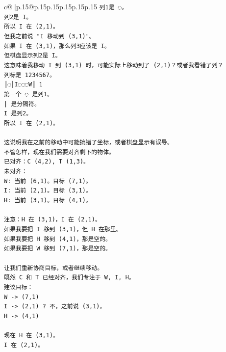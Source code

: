 \documentclass{article}
\begin{document}
{\begin{supertabular}{c@{$\;$}|p{.15\linewidth}@{}p{.15\linewidth}p{.15\linewidth}p{.15\linewidth}p{.15\linewidth}p{.15\linewidth}}
{{{\texttt{列1是 ◌。} \\
\texttt{列2是 I。} \\
\texttt{所以 I 在 (2,1)。} \\
\texttt{但我之前说 "I 移动到 (3,1)"。} \\
\texttt{如果 I 在 (3,1)，那么列3应该是 I。} \\
\texttt{但棋盘显示列2是 I。} \\
\texttt{这意味着我移动 I 到 (3,1) 时，可能实际上移动到了 (2,1)？或者我看错了列？} \\
\texttt{列标是 1234567。} \\
\texttt{║◌│I◌◌◌W║ 1} \\
\texttt{第一个 ◌ 是列1。} \\
\texttt{| 是分隔符。} \\
\texttt{I 是列2。} \\
\texttt{所以 I 在 (2,1)。} \\
\\ 
\texttt{这说明我在之前的移动中可能搞错了坐标，或者棋盘显示有误导。} \\
\texttt{不管怎样，现在我们需要对齐剩下的物体。} \\
\texttt{已对齐：C (4,2), T (1,3)。} \\
\texttt{未对齐：} \\
\texttt{W: 当前 (6,1)。目标 (7,1)。} \\
\texttt{I: 当前 (2,1)。目标 (3,1)。} \\
\texttt{H: 当前 (3,1)。目标 (4,1)。} \\
\\ 
\texttt{注意：H 在 (3,1)，I 在 (2,1)。} \\
\texttt{如果我要把 I 移到 (3,1)，但 H 在那里。} \\
\texttt{如果我要把 H 移到 (4,1)，那是空的。} \\
\texttt{如果我要把 W 移到 (7,1)，那是空的。} \\
\\ 
\texttt{让我们重新协商目标，或者继续移动。} \\
\texttt{既然 C 和 T 已经对齐，我们专注于 W, I, H。} \\
\texttt{建议目标：} \\
\texttt{W {-}> (7,1)} \\
\texttt{I {-}> (2,1) ? 不，之前说 (3,1)。} \\
\texttt{H {-}> (4,1)} \\
\\ 
\texttt{现在 H 在 (3,1)。} \\
\texttt{I 在 (2,1)。} \\
}}}
\end{supertabular}}
\end{document}
